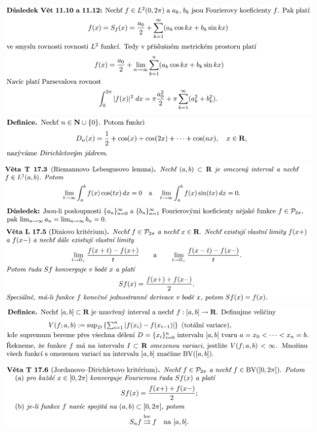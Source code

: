 \documentclass[12pt,a4paper]{article}
\begin{document}
\begin{center}
		\includegraphics[width=\textwidth]{img/4four/2020-06-21 11 44 17.png}\vspace{0.3cm}
		\includegraphics[width=\textwidth]{img/4four/2020-06-21 11 45 52.png}\vspace{0.3cm}
		\includegraphics[width=\textwidth]{img/4four/2020-06-21 11 46 20.png}\vspace{0.3cm}
		\includegraphics[width=\textwidth]{img/4four/2020-06-21 11 46 38.png}\vspace{0.3cm}
		\includegraphics[width=\textwidth]{img/4four/2020-06-21 11 47 24.png}\vspace{0.3cm}
		\includegraphics[width=\textwidth]{img/4four/2020-06-21 11 48 27.png}\vspace{0.3cm}
		\includegraphics[width=\textwidth]{img/4four/2020-06-21 11 47 48.png}\vspace{0.3cm}

\end{center}
\end{document}
